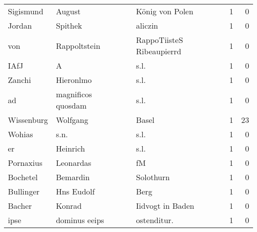 \begin{tabular}{llllrr}
                Sigismund &                             August &             &                             König von Polen &          1 &         0 \\
                   Jordan &                            Spithek &             &                                     aliczin &          1 &         0 \\
                      von &                       Rappoltstein &             &                   RappoTiisteS Ribeaupierrd &          1 &         0 \\
                     IAfJ &                                  A &             &                                        s.l. &          1 &         0 \\
                   Zanchi &                          Hieronlmo &             &                                        s.l. &          1 &         0 \\
                       ad &                 magnificos quosdam &             &                                        s.l. &          1 &         0 \\
               Wissenburg &                           Wolfgang &             &                                       Basel &          1 &        23 \\
                   Wohias &                               s.n. &             &                                        s.l. &          1 &         0 \\
                       er &                           Heinrich &             &                                        s.l. &          1 &         0 \\
                Pornaxius &                          Leonardas &             &                                          fM &          1 &         0 \\
                 Bochetel &                           Bemardin &             &                                   Solothurn &          1 &         0 \\
                Bullinger &                         Hns Eudolf &             &                                        Berg &          1 &         0 \\
                   Bacher &                             Konrad &             &                            Iidvogt in Baden &          1 &         0 \\
                     ipse &                      dominus eeips &             &                                ostenditur.  &          1 &         0 \\

\end{tabular}
